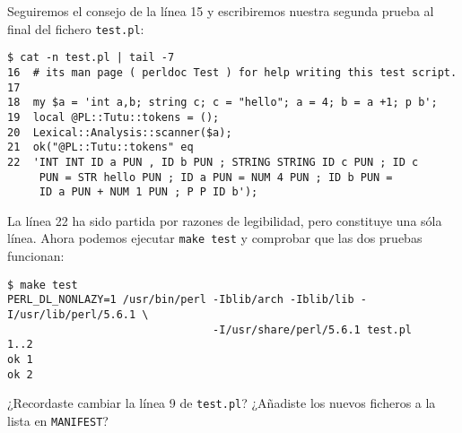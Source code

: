 Seguiremos el consejo de la línea 15 y escribiremos nuestra segunda
prueba al final del fichero \verb|test.pl|:
\begin{verbatim}
$ cat -n test.pl | tail -7
16  # its man page ( perldoc Test ) for help writing this test script.
17
18  my $a = 'int a,b; string c; c = "hello"; a = 4; b = a +1; p b';
19  local @PL::Tutu::tokens = ();
20  Lexical::Analysis::scanner($a);
21  ok("@PL::Tutu::tokens" eq
22  'INT INT ID a PUN , ID b PUN ; STRING STRING ID c PUN ; ID c 
     PUN = STR hello PUN ; ID a PUN = NUM 4 PUN ; ID b PUN = 
     ID a PUN + NUM 1 PUN ; P P ID b');

\end{verbatim}
La línea 22 ha sido partida por razones de legibilidad, pero constituye 
una sóla línea.
Ahora podemos ejecutar \verb|make test| y comprobar que las dos
pruebas funcionan:
\begin{verbatim}
$ make test
PERL_DL_NONLAZY=1 /usr/bin/perl -Iblib/arch -Iblib/lib -I/usr/lib/perl/5.6.1 \
                                -I/usr/share/perl/5.6.1 test.pl
1..2
ok 1
ok 2
\end{verbatim}
¿Recordaste cambiar la línea 9 de \verb|test.pl|?
¿Añadiste los nuevos ficheros a la lista en \verb|MANIFEST|?

